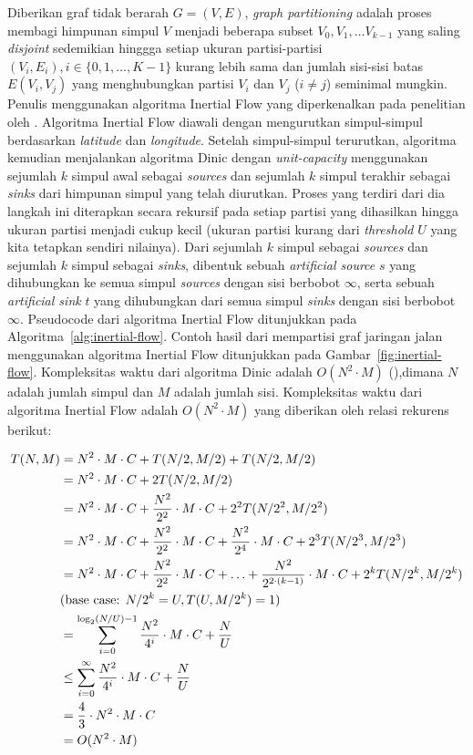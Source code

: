Diberikan graf tidak berarah $G=(V,E)$,  \textit{graph partitioning} adalah proses membagi himpunan simpul $V$ menjadi beberapa subset $V_0,V_1,\ldots V_{k-1}$ yang saling \textit{disjoint} sedemikian hinggga setiap ukuran partisi-partisi $(V_i,E_i),i\in\{0,1,\ldots, K-1\}$ kurang lebih sama dan jumlah sisi-sisi batas $E(V_i,V_j)$ yang menghubungkan partisi $V_i$ dan $V_j$ ($i\neq j$) seminimal mungkin. Penulis menggunakan algoritma Inertial Flow yang diperkenalkan pada penelitian oleh \cite{Schild2015}. Algoritma Inertial Flow diawali dengan mengurutkan simpul-simpul berdasarkan \textit{latitude} dan \textit{longitude}. Setelah simpul-simpul terurutkan, algoritma kemudian menjalankan algoritma Dinic dengan \textit{unit-capacity} \cite{Dinitz2006} menggunakan sejumlah $k$ simpul awal sebagai \textit{sources} dan sejumlah $k$ simpul terakhir sebagai \textit{sinks} dari himpunan simpul yang telah diurutkan. Proses yang terdiri dari dia langkah ini diterapkan secara rekursif pada setiap partisi yang dihasilkan hingga ukuran partisi menjadi cukup kecil (ukuran partisi kurang dari \textit{threshold} $U$ yang kita tetapkan sendiri nilainya). Dari sejumlah $k$ simpul sebagai \textit{sources} dan sejumlah $k$ simpul sebagai \textit{sinks}, dibentuk sebuah \textit{artificial source} $s$ yang dihubungkan ke semua simpul \textit{sources} dengan sisi berbobot $\infty$, serta sebuah \textit{artificial sink} $t$ yang dihubungkan dari semua simpul \textit{sinks} dengan sisi berbobot $\infty$. Pseudocode dari algoritma Inertial Flow ditunjukkan pada Algoritma~\ref{alg:inertial-flow}. Contoh hasil dari mempartisi graf jaringan jalan menggunakan algoritma Inertial Flow ditunjukkan pada Gambar~\ref{fig:inertial-flow}. Kompleksitas waktu dari algoritma Dinic adalah $O(N^2\cdot M)$ (\cite{Dinitz2006}),dimana $N$ adalah jumlah simpul dan $M$ adalah jumlah sisi. Kompleksitas waktu dari algoritma Inertial Flow adalah $O(N^2\cdot M)$ yang diberikan oleh relasi rekurens berikut:

\begin{align}
    T(N,M)&=N^2\cdot M \cdot C + T(N/2,M/2)+T(N/2,M/2) \notag \\
    &=N^2\cdot M \cdot C + 2T(N/2,M/2)  \notag \\
    &= N^2\cdot M \cdot C + \frac{ N^2}{2^2}\cdot M \cdot C + 2^2T(N/2^2,M/2^2)  \notag \\
    &= N^2\cdot M \cdot C + \frac{ N^2}{2^2}\cdot M   \cdot C + \frac{ N^2}{2^4}\cdot M \cdot C  + 2^3T(N/2^3,M/2^3)  \notag \\
    &= N^2\cdot M \cdot C + \frac{ N^2}{2^2}\cdot M \cdot C + \ldots + \frac{ N^2}{2^{2\cdot (k-1)}}\cdot M \cdot C  + 2^kT(N/2^k, M/2^k)  \notag \\
    & \text{(base case: $N/2^k = U, T(U,M/2^k)=1$)}  \notag \\ 
    &=\sum_{i=0}^{\log_2(N/U)-1} \frac{ N^2}{4^{i}}\cdot M \cdot C + \frac{N}{U}  \notag \\
    &\leq \sum_{i=0}^{\infty} \frac{ N^2}{4^i}\cdot M \cdot C+ \frac{N}{U}  \notag \\
    &= \frac{4}{3}\cdot N^2 \cdot M \cdot C \notag \\
    &=O(N^2\cdot M) \notag 
\end{align}


